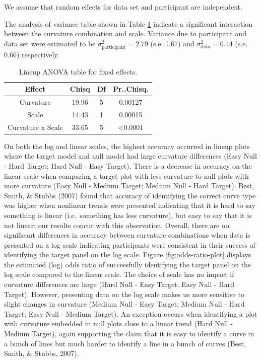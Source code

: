 \documentclass[print]{nuthesis}
\begin{document}
\noindent We assume that random effects for data set and participant are independent.

The analysis of variance table shown in Table \ref{tab:lineup-anova-table} indicate a significant interaction between the curvature combination and scale. Variance due to participant and data set were estimated to be \(\sigma^2_{\text{participant}} = 2.79\) (s.e. 1.67) and \(\sigma^2_{\text{data}} = 0.44\) (s.e. 0.66) respectively.

\begin{table}

\caption{\label{tab:lineup-anova-table}Lineup ANOVA table for fixed effects.}
\centering
\begin{tabular}[t]{cccc}
\toprule
Effect & Chisq & Df & Pr..Chisq.\\
\midrule
Curvature & 19.96 & 5 & 0.00127\\
Scale & 14.43 & 1 & 0.00015\\
Curvature x Scale & 33.65 & 5 & <0.0001\\
\bottomrule
\end{tabular}
\end{table}

On both the log and linear scales, the highest accuracy occurred in lineup plots where the target model and null model had large curvature differences (Easy Null - Hard Target; Hard Null - Easy Target).
There is a decrease in accuracy on the linear scale when comparing a target plot with less curvature to null plots with more curvature (Easy Null - Medium Target; Medium Null - Hard Target).
Best, Smith, \& Stubbs (2007) found that accuracy of identifying the correct curve type was higher when nonlinear trends were presented indicating that it is hard to say something is linear (i.e.~something has less curvature), but easy to say that it is not linear; our results concur with this observation.
Overall, there are no significant differences in accuracy between curvature combinations when data is presented on a log scale indicating participants were consistent in their success of identifying the target panel on the log scale.
Figure \ref{fig:odds-ratio-plot} displays the estimated (log) odds ratio of successfully identifying the target panel on the log scale compared to the linear scale.
The choice of scale has no impact if curvature differences are large (Hard Null - Easy Target; Easy Null - Hard Target).
However, presenting data on the log scale makes us more sensitive to slight changes in curvature (Medium Null - Easy Target; Medium Null - Hard Target; Easy Null - Medium Target).
An exception occurs when identifying a plot with curvature embedded in null plots close to a linear trend (Hard Null - Medium Target), again supporting the claim that it is easy to identify a curve in a bunch of lines but much harder to identify a line in a bunch of curves (Best, Smith, \& Stubbs, 2007).
\end{document}
